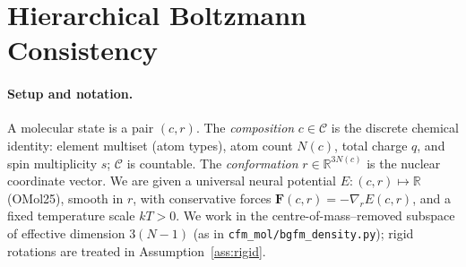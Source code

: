 %

\section{Hierarchical Boltzmann Consistency}
\label{app:hbc}

\newtheorem{theorem}{Theorem}
\newtheorem{corollary}{Corollary}
\newtheorem{assumption}{Assumption}
\newtheorem{remark}{Remark}

\paragraph{Setup and notation.}
A molecular state is a pair $(c, r)$. The \emph{composition} $c \in \mathcal{C}$
is the discrete chemical identity: element multiset (atom types), atom count
$N(c)$, total charge $q$, and spin multiplicity $s$; $\mathcal{C}$ is countable.
The \emph{conformation} $r \in \mathbb{R}^{3N(c)}$ is the nuclear coordinate vector.
We are given a universal neural potential $E : (c, r) \mapsto \mathbb{R}$ (OMol25),
smooth in $r$, with conservative forces $\mathbf{F}(c,r) = -\nabla_r E(c,r)$, and a
fixed temperature scale $kT > 0$. We work in the centre-of-mass–removed subspace
of effective dimension $3(N-1)$ (as in \texttt{cfm\_mol/bgfm\_density.py}); rigid
rotations are treated in Assumption~\ref{ass:rigid}.

